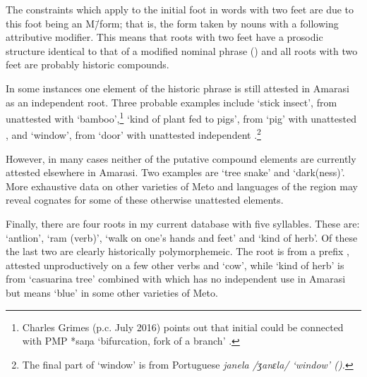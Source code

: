 The constraints which apply to the initial foot in words with two feet
are due to this foot being an M\=/form; that is,
the form taken by nouns with a following attributive modifier.
This means that roots with two feet have a prosodic structure
identical to that of a modified nominal phrase ()
and all roots with two feet are probably historic compounds.

In some instances one element of the historic phrase is still attested in Amarasi as an independent root.
Three probable examples include  `stick insect',
from unattested  with  `bamboo',\footnote{
		Charles Grimes (p.c. July 2016) points out that
		initial  could be connected with PMP
		*saŋa `bifurcation, fork of a branch' \cite{bltr}.}
 `kind of plant fed to pigs', from 
`pig' with unattested ,
and  `window', from  `door'
with unattested independent .\footnote{
		The final part of  `window' is
		from Portuguese \it{janela} /ʒanɛla/ `window' ().}

However, in many cases neither of the putative compound elements
are currently attested elsewhere in Amarasi.
Two examples are  `tree snake' and  `dark(ness)'.
More exhaustive data on other varieties of Meto and languages of the region
may reveal cognates for some of these otherwise unattested elements.

Finally, there are four roots in my current database with five syllables.
These are:  `antlion',  `ram (verb)',
 `walk on one's hands and feet' and  `kind of herb'.
Of these the last two are clearly historically polymorphemeic.
The root  is from a prefix ,
attested unproductively on a few other verbs and  `cow',
while  `kind of herb' is from  `casuarina tree'
combined with  which has no independent use in Amarasi but
means `blue' in some other varieties of Meto.
